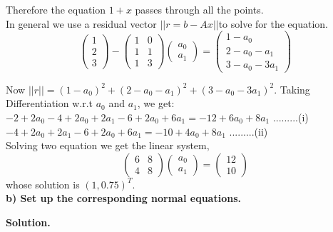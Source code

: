 \documentclass[12pt, oneside]{article}   	%
\begin{document}
\begin{enumerate}
	Therefore the equation $1+x$  passes through all the points.\\
	
	In general we use a residual vector $||r= b-Ax||$to solve for the equation.
		$$\left(\begin{array}{c}1\\2\\3\end{array}\right)- \left(\begin{array}{cc}1&0\\1&1\\1&3\end{array}\right)\left(\begin{array}{c}a_0\\a_1\end{array}\right)=\left(\begin{array}{c}1-a_0\\2-a_0 -a_1\\3-a_0 -3a_1\end{array}\right)$$
		
		Now $||r||=(1-a_0)^2+(2-a_0 -a_1)^2+ (3-a_0 -3a_1)^2$.
	Taking Differentiation w.r.t $a_0$ and $a_1$, we get:\\
	$-2+2a_0-4 + 2a_0 +2a_1-6+2a_0+6a_1= -12+ 6a_0+8a_1$  \hspace{2cm }.........(i)
	$-4 + 2a_0 +2a_1-6+2a_0+6a_1= -10+ 4a_0+8a_1$ \hspace{4cm }.........(ii)\\
	Solving two equation we get  the linear system, 
	$$\left(\begin{array}{cc}6&8\\4&8\end{array}\right)\left(\begin{array}{c}a_0\\a_1\end{array}\right)=\left(\begin{array}{c}12\\10\end{array}\right)$$
	whose solution is $(1,0.75)^T$.\\
	
	
	
	\textbf{b) Set up the corresponding normal equations.}
	
	\textbf{Solution.}\\
	

\end{enumerate}
\end{document}
